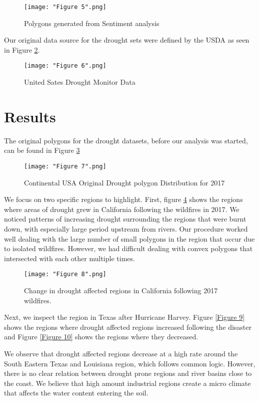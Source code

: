 \documentclass[conference]{IEEEtran}
\begin{document}
\begin{figure}[ht]
\centerline{\texttt{[image: "Figure 5".png]}}
\caption{Polygons generated from Sentiment analysis}
\label{Figure 5}
\end{figure}

Our original data source for the drought sets were defined by the USDA as seen in Figure \ref{Figure 6}.

\begin{figure}[ht]
\centerline{\texttt{[image: "Figure 6".png]}}
\caption{United Sates Drought Monitor Data}
\label{Figure 6}
\end{figure}

\section{Results}

The original polygons for the drought datasets, before our analysis was started, can be found in Figure \ref{Figure 7}

\begin{figure}[ht]
\centerline{\texttt{[image: "Figure 7".png]}}
\caption{Continental USA  Original Drought polygon Distribution for 2017}
\label{Figure 7}
\end{figure}

We focus on two specific regions to highlight. First, figure \ref{Figure 8} shows the regions where areas of drought grew in California following the wildfires in 2017. We noticed patterns of increasing drought surrounding the regions that were burnt down, with especially large period upstream from rivers. Our procedure worked well dealing with the large number of small polygons in the region that occur due to isolated wildfires. However, we had difficult dealing with convex polygons that intersected with each other multiple times.

\begin{figure}[ht]
\centerline{\texttt{[image: "Figure 8".png]}}
\caption{Change in drought affected regions in California following 2017 wildfires.}
\label{Figure 8}
\end{figure}

Next, we inspect the region in Texas after Hurricane Harvey. Figure \ref{Figure 9} shows the regions where drought affected regions increased following the disaster and Figure \ref{Figure 10} shows the regions where they decreased.

We observe that drought affected regions decrease at a high rate around the South Eastern Texas and Louisiana region, which follows common logic. However, there is no clear relation between drought prone regions and river basins close to the coast. We believe that high amount industrial regions create a micro climate that affects the water content entering the soil.
\end{document}
